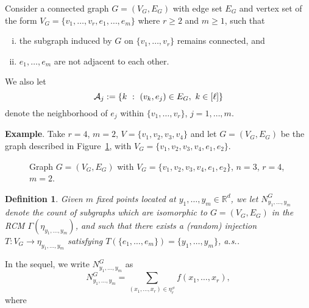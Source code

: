 \documentclass[12pt]{article}
\newcommand{\R}{\mathbb{R}}
\newtheorem{definition}[prop]{Definition}
\numberwithin{equation}{section}
\begin{document}
\medskip

Consider a connected graph $G=(V_G,E_G)$ with edge set $E_G$ and
vertex set of the form %
$V_G=\{v_1, \ldots ,v_r, e_1,\ldots , e_m\}$ 
where $r\geq 2$ and $m\geq 1$, such that
\begin{enumerate}[i)]
\item the subgraph induced by $G$ on $\{v_1, \ldots ,v_r\}$ remains connected, and 
\item $e_1, \ldots ,e_m$ are not adjacent to each other. 
\end{enumerate}
\noindent
 We also let 
\begin{equation}
\nonumber
    {\cal A}_j:=\{ k \ : \ (v_k,e_j) \in E_G, 
    \
    k\in [\ell] \}
\end{equation} 
denote the neighborhood of $e_j$ within $\{v_1, \ldots ,v_r\}$,
$j=1,\ldots , m$.  

\medskip 

 \noindent
{\bf Example}. 
Take $r=4$, $m=2$, $V = \{v_1, v_2, v_3 ,v_4\}$ %
and let $G=(V_G,E_G)$ be the graph described in Figure~\ref{fig:diagram0}, 
 with $V_G=\{v_1, v_2,v_3,v_4,e_1,e_2\}$.

\begin{figure}[H]
  \centering
\caption{
 Graph $G=(V_G,E_G)$ with $V_G=\{v_1, v_2,v_3,v_4,e_1,e_2\}$, 
 $n=3$, $r=4$, $m=2$.}
\label{fig:diagram0}
\end{figure}
\begin{definition}
 Given $m$ fixed points located at $y_1 , \ldots,y_m \in \R^d$,
 we let $N_{y_1,\ldots , y_m}^G$ denote the count of subgraphs
 which are isomorphic to $G=(V_G,E_G)$ in
 the RCM $\Gamma(\eta_{y_1,\ldots , y_m } )$, and 
 such that there exists a (random) injection
 $T:V_G \to \eta_{y_1,\ldots , y_m }$
 satisfying $T(\{e_1,\ldots , e_m\})=\{y_1,\ldots , y_m\}$, a.s.. 
\end{definition}
\noindent
 In the sequel, we write $N_{y_1,\ldots , y_m}^G$ as  
\begin{equation}
\nonumber
  N_{y_1,\ldots , y_m}^G=\sum_{(x_1, \ldots ,x_r)\in\eta_r^{\ne}}f(x_1, \ldots ,x_r), 
\end{equation}
 where
 
\end{document}
